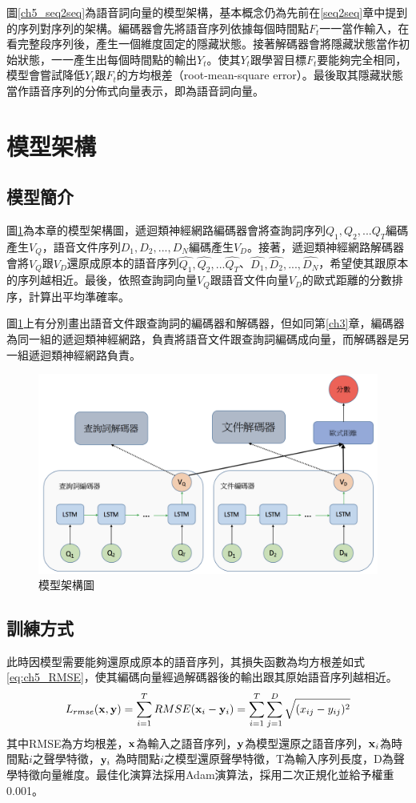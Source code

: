 圖\ref{ch5_seq2seq}為語音詞向量的模型架構，基本概念仍為先前在\ref{seq2seq}章中提到的序列對序列的架構。編碼器會先將語音序列依據每個時間點$F_t$一一當作輸入，在看完整段序列後，產生一個維度固定的隱藏狀態。接著解碼器會將隱藏狀態當作初始狀態，一一產生出每個時間點的輸出$Y_t$。使其$Y_t$跟學習目標$F_t$要能夠完全相同，模型會嘗試降低$Y_t$跟$F_t$的方均根差（root-mean-square
error）。最後取其隱藏狀態當作語音序列的分佈式向量表示，即為語音詞向量。
\section{模型架構}
\subsection{模型簡介}
圖\ref{ch5_model}為本章的模型架構圖，遞迴類神經網路編碼器會將查詢詞序列$Q_1,Q_2,...Q_T$編碼產生$V_Q$，語音文件序列$D_1,D_2,...,D_N$編碼產生$V_D$。接著，遞迴類神經網路解碼器會將$V_Q$跟$V_D$還原成原本的語音序列$\hat{Q_1},\hat{Q_2},...\hat{Q_T}$、$\hat{D_1},\hat{D_2},...,\hat{D_N}$，希望使其跟原本的序列越相近。最後，依照查詢詞向量$V_Q$跟語音文件向量$V_D$的歐式距離的分數排序，計算出平均準確率。

圖\ref{ch5_model}上有分別畫出語音文件跟查詢詞的編碼器和解碼器，但如同第\ref{ch3}章，編碼器為同一組的遞迴類神經網路，負責將語音文件跟查詢詞編碼成向量，而解碼器是另一組遞迴類神經網路負責。
\begin{figure}[h]
\centering
\includegraphics[scale=0.5]{images/ch5_model.png} 
\caption{模型架構圖}
\label{ch5_model}
\end{figure}
\subsection{訓練方式}
此時因模型需要能夠還原成原本的語音序列，其損失函數為均方根差如式\ref{eq:ch5_RMSE}，使其編碼向量經過解碼器後的輸出跟其原始語音序列越相近。
\begin{equation}
\label{eq:ch5_RMSE}
L_{rmse} (\bold{x},\bold{y}) = \sum_{i=1}^{T}
RMSE(\bold{x}_i-\bold{y}_i) = \sum_{i=1}^{T} \sum_{j=1}^D \sqrt{(x_{ij}-y_{ij})^2}
\end{equation}
其中RMSE為方均根差，$\bold{x}$為輸入之語音序列，$\bold{y}$為模型還原之語音序列，$\bold{x}_i$為時間點$i$之聲學特徵，$\bold{y}_i$
為時間點$i$之模型還原聲學特徵，T為輸入序列長度，D為聲學特徵向量維度。最佳化演算法採用Adam演算法，採用二次正規化並給予權重0.001。


